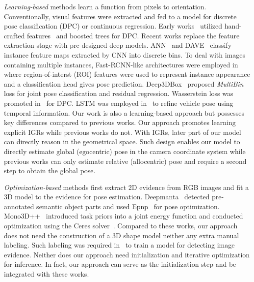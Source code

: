 \documentclass[final]{cvpr}
\begin{document}
\emph{Learning-based} methods learn a function from pixels to orientation. Conventionally, visual features were extracted and fed to a model for discrete pose classification (DPC) or continuous regression. Early works~\cite{juranek2015real, xiang2015data} utilized hand-crafted features~\cite{dollar2014fast} and boosted trees for DPC. Recent works replace the feature extraction stage with pre-designed deep models. ANN~\cite{yang2014object} and DAVE~\cite{zhou2016dave, zhou2017fast} classify instance feature maps extracted by CNN into discrete bins. To deal with images containing multiple instances, Fast-RCNN-like architectures were employed in~\cite{chen20153d, braun2016pose, chen20173d, huang2019perspectivenet, Ke_2020_ECCV} where region-of-interst (ROI) features were used to represent instance appearance and a classification head gives pose prediction. Deep3DBox~\cite{mousavian20173d} proposed \emph{MultiBin} loss for joint pose classification and residual regression. Wasserstein loss was promoted in~\cite{liu2019conservative} for DPC. LSTM was employed in~\cite{hu2019joint} to refine vehicle pose using temporal information.
Our work is also a learning-based approach but possesses key differences compared to previous works. Our approach promotes learning explicit IGRs while previous works do not. With IGRs, later part of our model can directly reason in the geometrical space. Such design enables our model to directly estimate global (egocentric) pose in the camera coordinate system while previous works can only estimate relative (allocentric) pose and require a second step to obtain the global pose.  

\emph{Optimization-based} methods first extract 2D evidence from RGB images and fit a 3D model to the evidence for pose estimation. 
Deepmanta~\cite{chabot2017deep} detected pre-annotated semantic object parts and used Epnp~\cite{lepetit2009epnp} for pose optimization. Mono3D++~\cite{he2019mono3d++} introduced task priors into a joint energy function and conducted optimization using the Ceres solver~\cite{ceres-solver}. Compared to these works, our approach does not need the construction of a 3D shape model neither any extra manual labeling. Such labeling was required in~\cite{chabot2017deep} to train a model for detecting image evidence. Neither does our approach need initialization and iterative optimization for inference. In fact, our approach can serve as the initialization step and be integrated with these works.  
\end{document}
